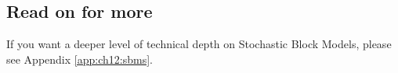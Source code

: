 \subsection{Read on for more}

If you want a deeper level of technical depth on Stochastic Block Models, please see Appendix \ref{app:ch12:sbms}.


\newpage
